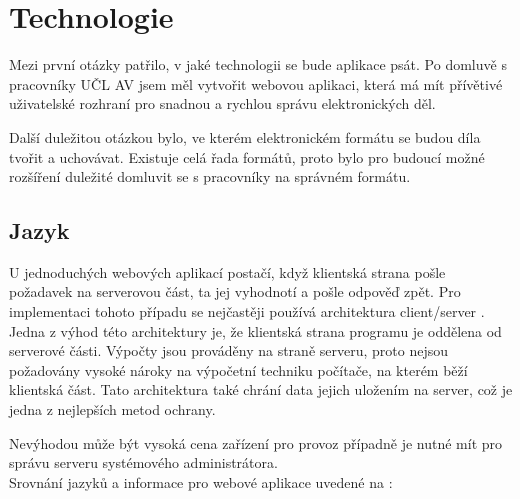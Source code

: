     \section{Technologie}
        Mezi první otázky patřilo, v jaké technologii se bude aplikace psát. Po domluvě s pracovníky UČL AV jsem měl vytvořit webovou aplikaci, která má mít přívětivé uživatelské rozhraní pro snadnou a rychlou správu elektronických děl.
        
        Další duležitou otázkou bylo, ve kterém elektronickém formátu se budou díla tvořit a uchovávat. Existuje celá řada formátů, proto bylo pro budoucí možné rozšíření duležité domluvit se s pracovníky na správném formátu.
        
        \subsection{Jazyk}
            U jednoduchých webových aplikací postačí, když klientská strana pošle požadavek na serverovou část, ta jej vyhodnotí a pošle odpověď zpět. Pro implementaci tohoto případu se nejčastěji používá architektura client/server \cite{languages}. 
            Jedna z výhod této architektury je, že klientská strana programu je oddělena od serverové části. Výpočty jsou prováděny na straně serveru, proto nejsou požadovány vysoké nároky na výpočetní techniku počítače, na kterém běží klientská část. Tato architektura také chrání data jejich uložením na server, což je jedna z nejlepších metod ochrany.
            
            Nevýhodou může být vysoká cena zařízení pro provoz případně je nutné mít pro správu serveru systémového administrátora.\\
            Srovnání jazyků a informace pro webové aplikace uvedené na \cite{languages}:
            
